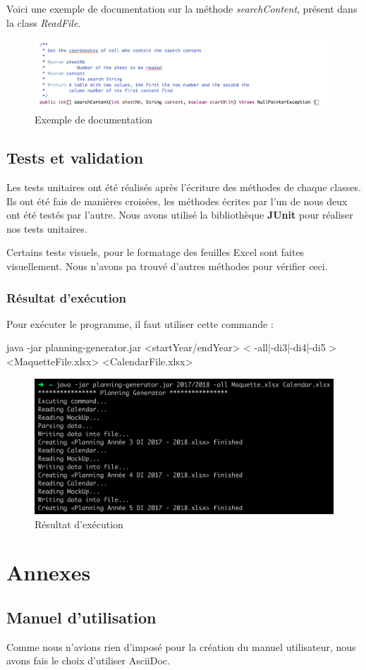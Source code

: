 \documentclass{polytech/polytech}
\begin{document}
	Voici une exemple de documentation sur la méthode \textit{searchContent}, présent dans la class \textit{ReadFile}.

	\begin{figure}
		\caption{Exemple de documentation}
		\includegraphics[width=\textwidth]{./img/documentation.png}
	\end{figure}
	
	\section{Tests et validation}
	
	Les tests unitaires ont été réalisés après l'écriture des méthodes de chaque classes.
	Ils ont été fais de manières croisées, les méthodes écrites par l'un de nous deux ont été testés par l'autre.
	Nous avons utilisé la bibliothèque \textbf{JUnit} pour réaliser nos tests unitaires.
	
	Certains tests visuels, pour le formatage des feuilles Excel sont faites visuellement.
	Nous n'avons pa trouvé d'autres méthodes pour vérifier ceci.
	
	\subsection{Résultat d'exécution}
	
	Pour exécuter le programme, il faut utiliser cette commande :
	
	\begin{latexsource}
	java -jar planning-generator.jar <startYear/endYear> < -all|-di3|-di4|-di5 > <MaquetteFile.xlsx> <CalendarFile.xlsx>
	\end{latexsource}

	\begin{figure}
		\caption{Résultat d'exécution}
		\includegraphics[width=15cm]{./img/excution_result2.png}
	\end{figure}
	
	
	\chapter{Annexes}

	\section{Manuel d'utilisation}
	Comme nous n'avions rien d'imposé pour la création du manuel utilisateur, nous avons fais le choix d'utiliser AsciiDoc.

	
\end{document}
